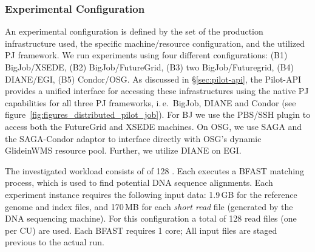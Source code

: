 \documentclass[conference]{IEEEtran}
\begin{document}

\subsubsection*{Experimental Configuration}


An experimental configuration is defined by the set of the production
infrastructure used, the specific machine/resource configuration, and
the utilized PJ framework.  We run experiments using four different
configurations: (B1) BigJob/XSEDE, (B2) BigJob/FutureGrid, (B3) two
BigJob/Futuregrid, (B4) DIANE/EGI, (B5) Condor/OSG.   As discussed in
\S\ref{sec:pilot-api}, the Pilot-API provides a unified interface for
accessing these infrastructures using the native PJ  capabilities for all three PJ
frameworks, i.\,e.\ BigJob, DIANE and Condor (see
figure~\ref{fig:figures_distributed_pilot_job}).  For BJ we use the
PBS/SSH plugin to access both the FutureGrid and XSEDE machines.  On
OSG, we use SAGA and the SAGA-Condor adaptor to interface directly
with OSG's dynamic GlideinWMS resource pool. Further, we utilize
DIANE on EGI.

The investigated workload consists of of 128 \cus. Each \cu executes a BFAST
matching process, which is used to find potential DNA sequence alignments.
Each experiment instance requires the following input data: 1.9\,GB for the
reference genome and index files, and 170\,MB for each \textit{short read}
file (generated by the DNA sequencing machine). For this configuration a total
of 128 read files (one per CU) are used. Each BFAST \cu requires 1 core; All
input files are staged previous to the actual run.

\end{document}
